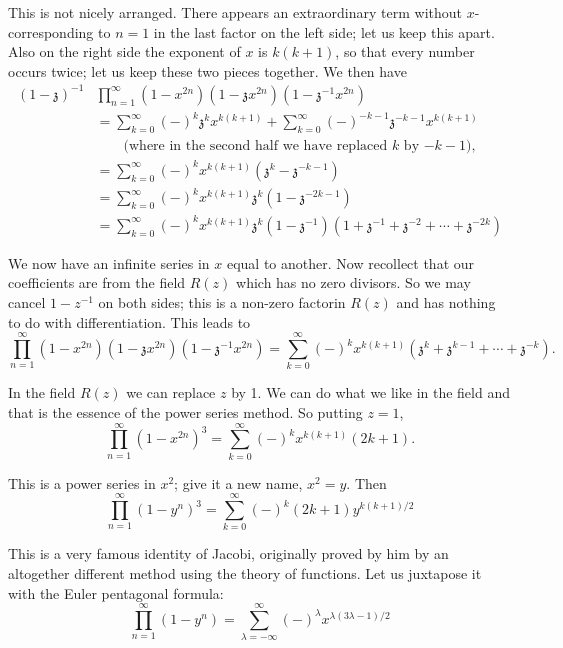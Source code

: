 This is not nicely arranged. There appears an extraordinary term
without $x$- corresponding to $n=1$ in the last factor on the left
side; let us keep this apart. Also on the right side the exponent of
$x$ is $k(k+1)$, so that every number occurs twice; let us keep these
two pieces together. We then have
\begin{align*}
  (1-\mathfrak{z})^{-1} & \prod^\infty_{n=1}
  (1-x^{2n})(1-\mathfrak{z}x^{2n}) (1-\mathfrak{z}^{-1} x^{2n})\\
  & = \sum^\infty_{k=0} (-)^k \mathfrak{z}^k x^{k(k+1)} +
  \sum^\infty_{k=0} (-)^{-k-1} \mathfrak{z}^{-k-1} x^{k(k+1)}\\
  & \qquad \text{(where in the second half we have replaced $k$ by
    $-k-1$),}\\
  & = \sum^\infty_{k=0} (-)^k x^{k(k+1)}
  (\mathfrak{z}^k-\mathfrak{z}^{-k-1})\\
  & = \sum^\infty_{k=0} (-)^k x^{k(k+1)} \mathfrak{z}^k
  (1-\mathfrak{z}^{-2k-1})\\
  & = \sum^\infty_{k=0} (-)^k x^{k(k+1)}
  \mathfrak{z}^k (1-\mathfrak{z}^{-1})  (1+ \mathfrak{z}^{-1} +
  \mathfrak{z}^{-2}+ \cdots + \mathfrak{z}^{-2k})
\end{align*}

We now have an infinite series in $x$ equal to another. Now recollect
that our coefficients are from the field $R(z)$ which has no zero
divisors. So we may cancel $1-z^{-1}$ on both sides; this is a
non-zero factor\pageoriginale  in $R(z)$ and has nothing to do with
differentiation. This leads to
$$
\prod^\infty_{n=1} (1-x^{2n})
(1-\mathfrak{z}x^{2n})(1-\mathfrak{z}^{-1} x^{2n}) = \sum^\infty_{k=0}
(-)^k x^{k(k+1)} (\mathfrak{z}^k + \mathfrak{z}^{k-1} + \cdots +
\mathfrak{z}^{-k}). 
$$

In the field $R(z)$ we can replace $z$ by 1. We can do what we like in
the field and that is the essence of the power series method. So
putting $z=1$,
$$
\prod^\infty_{n=1} (1-x^{2n})^3 = \sum^\infty_{k=0} (-)^k x^{k(k+1)} (2k+1).
$$

This is a power series in $x^2$; give it a new name, $x^2=y$. Then
\begin{equation*}
  \prod^\infty_{n=1} (1-y^n)^3 = \sum^\infty_{k=0} (-)^k (2k+1)
  y^{k(k+1)/2} \tag{2}\label{part1:lec6:eq2}
\end{equation*}

This is a very famous identity of Jacobi, originally proved by him by
an altogether different method using the theory of functions. Let us
juxtapose it with the Euler pentagonal formula:
\begin{equation*}
  \prod^\infty_{n=1} (1-y^n) = \sum^\infty_{\lambda=-\infty}
  (-)^\lambda x^{\lambda(3\lambda -1)/2} \tag{2a}\label{part1:lec6:eq2a}
\end{equation*}

